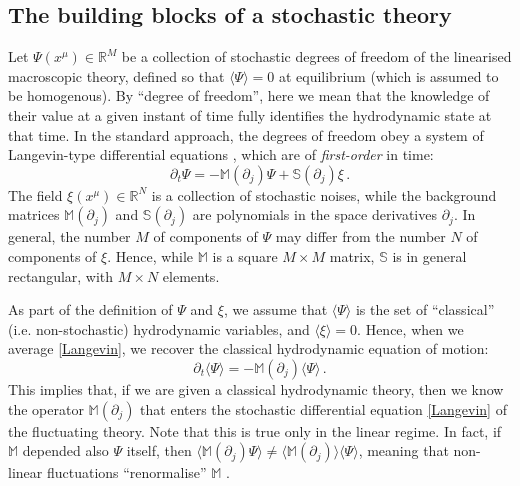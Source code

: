 \documentclass[a4paper, amsfonts, amssymb, amsmath, reprint, showkeys, nofootinbib, twoside,notitlepage,onecolumn]{revtex4-2}
\newcommand{\Ma}{{\mathbb{M}}}
\newcommand{\Sa}{{\mathbb{S}}}
\theoremstyle{definition}
\begin{document}
\subsection{The building blocks of a stochastic theory}

Let $\Psi(x^\mu)\in \mathbb{R}^M$ be a collection of stochastic degrees of freedom of the linearised macroscopic theory, defined so that $\langle\Psi \rangle=0$ at equilibrium (which is assumed to be homogenous). By ``degree of freedom'', here we mean that the knowledge of their value at a given instant of time fully identifies the hydrodynamic state at that time. In the standard approach, the degrees of freedom obey a system of Langevin-type differential equations \cite{landau6}, which are of \textit{first-order} in time:
\begin{equation}\label{Langevin}
    \partial_t \Psi = -\Ma (\partial_j)\Psi +\Sa(\partial_j) \xi \, .
\end{equation}
The field $\xi(x^\mu)\in \mathbb{R}^N$ is a collection of stochastic noises, while the background matrices $\Ma(\partial_j)$ and $\Sa(\partial_j)$ are polynomials in the space derivatives $\partial_j$. In general, the number $M$ of components of $\Psi$ may differ from the number $N$ of components of $\xi$. Hence, while $\Ma$ is a square $M {\times} M$ matrix, $\Sa$ is in general rectangular, with $M {\times} N$ elements.

As part of the definition of $\Psi$ and $\xi$, we assume that $\langle \Psi \rangle$ is the set of ``classical'' (i.e. non-stochastic) hydrodynamic variables, and $\langle \xi \rangle =0$. Hence, when we average \eqref{Langevin}, we recover the classical hydrodynamic equation of motion:
\begin{equation}\label{classical}
   \partial_t \langle \Psi \rangle = -\Ma (\partial_j)\langle \Psi \rangle  \, .
\end{equation}
This implies that, if we are given a classical hydrodynamic theory, then we know the operator $\Ma(\partial_j)$ that enters the stochastic differential equation \eqref{Langevin} of the fluctuating theory. Note that this is true only in the linear regime. In fact, if $\Ma$ depended also $\Psi$ itself, then $\langle\Ma (\partial_j)\Psi\rangle \neq \langle\Ma (\partial_j)\rangle \langle\Psi\rangle$, meaning that non-linear fluctuations ``renormalise'' $\Ma$ \cite{KovtunStickiness2011}.
\end{document}
